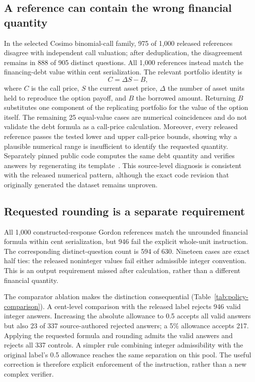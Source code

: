 \subsection{A reference can contain the wrong financial quantity}\label{sec:wrong-quantity}
In the selected Cosimo binomial-call family, 975 of 1,000 released references disagree with independent call valuation; after deduplication, the disagreement remains in 888 of 905 distinct questions. All 1,000 references instead match the financing-debt value within cent serialization. The relevant portfolio identity is
\begin{equation}
C=\Delta S-B,
\end{equation}
where $C$ is the call price, $S$ the current asset price, $\Delta$ the number of asset units held to reproduce the option payoff, and $B$ the borrowed amount. Returning $B$ substitutes one component of the replicating portfolio for the value of the option itself. The remaining 25 equal-value cases are numerical coincidences and do not validate the debt formula as a call-price calculation. Moreover, every released reference passes the tested lower and upper call-price bounds, showing why a plausible numerical range is insufficient to identify the requested quantity. Separately pinned public code computes the same debt quantity and verifies answers by regenerating its template~\cite{cosimosource}. This source-level diagnosis is consistent with the released numerical pattern, although the exact code revision that originally generated the dataset remains unproven.

\subsection{Requested rounding is a separate requirement}
All 1,000 constructed-response Gordon references match the unrounded financial formula within cent serialization, but 946 fail the explicit whole-unit instruction. The corresponding distinct-question count is 594 of 630. Nineteen cases are exact half ties: the released noninteger values fail either admissible integer convention. This is an output requirement missed after calculation, rather than a different financial quantity.

The comparator ablation makes the distinction consequential (Table~\ref{tab:policy-comparison}). A cent-level comparison with the released label rejects 946 valid integer answers. Increasing the absolute allowance to 0.5 accepts all valid answers but also 23 of 337 source-authored rejected answers; a 5\% allowance accepts 217. Applying the requested formula and rounding admits the valid answers and rejects all 337 controls. A simpler rule combining integer admissibility with the original label's 0.5 allowance reaches the same separation on this pool. The useful correction is therefore explicit enforcement of the instruction, rather than a new complex verifier.

